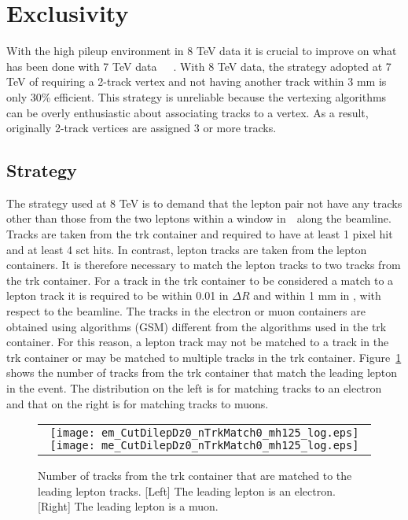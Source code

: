 \section{Exclusivity }
\label{sec:exclusivity}

\par With the high pileup environment in 8 TeV data it is crucial to improve
on what has been done with 7 TeV data~\cite{CMSmumu}~\cite{CMSee}~\cite{MonteNote}.
With 8 TeV data, the strategy adopted at 7 TeV of requiring a 2-track vertex
and not having another track within 3 mm is only 30\% efficient. This strategy 
 is unreliable because the vertexing algorithms can be overly enthusiastic about 
associating tracks to a vertex. As a result, originally 2-track
vertices are assigned 3 or more tracks.   

\subsection{Strategy}
\par The strategy used at 8 TeV is to demand that the lepton pair not have any tracks
other than those from the two leptons within a window in~\ along 
the beamline. Tracks are taken from the trk container and required to have 
at least 1 pixel hit and at least 4 sct hits. In contrast, lepton tracks are taken 
from the lepton containers. It is therefore necessary to match the lepton tracks to two tracks from the trk container.
For a track in the trk container to be considered a match to a lepton track it is required to
be within 0.01 in $\Delta R$ and within 1 mm  in , with respect to 
the beamline. The tracks in the electron or muon
containers are obtained using algorithms (GSM) different from the algorithms
used in the trk container. For this reason, a lepton track may not be matched to a track in the trk container
or may be matched to multiple tracks in the trk container. Figure~\ref{fig:trackMatching} 
shows the number of tracks from the trk container that match the leading lepton 
in the event. The distribution on the left is for matching tracks to an electron and 
that on the right is for matching tracks to muons. 
 
\begin{figure}[!h]
\centering
\begin{tabular}{c}
	\texttt{[image: em\_CutDilepDz0\_nTrkMatch0\_mh125\_log.eps]}
	\texttt{[image: me\_CutDilepDz0\_nTrkMatch0\_mh125\_log.eps]}\\
\end{tabular}
\caption{Number of tracks from the trk container that are matched to the leading 
lepton tracks. [Left] The leading lepton is an electron. [Right] The leading lepton 
is a muon.}
\label{fig:trackMatching}
\end{figure}

